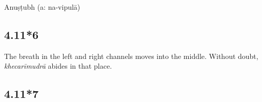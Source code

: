 \begin{ekdosis}
\begin{metre}[hp04_011_5]
Anuṣṭubh (a: na-vipulā)
\end{metre}

\subsection*{4.11*6}
\begin{translation}[hp04_011_6]
The breath in the left and right channels moves into the middle. Without doubt, \emph{khecarīmudrā} abides in that place.
\end{translation}




\subsection*{4.11*7}



\end{ekdosis}
